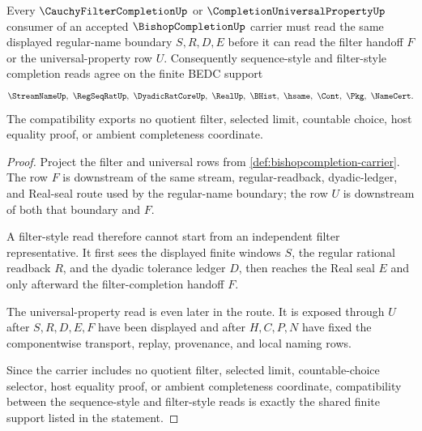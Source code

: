 \begin{theorem}
\label{thm:bishopcompletion-filter-compatibility}
Every $\CauchyFilterCompletionUp$ or $\CompletionUniversalPropertyUp$ consumer of an accepted $\BishopCompletionUp$ carrier must read the same displayed regular-name boundary $S,R,D,E$ before it can read the filter handoff $F$ or the universal-property row $U$. Consequently sequence-style and filter-style completion reads agree on the finite BEDC support
$$
\StreamNameUp,\ \RegSeqRatUp,\ \DyadicRatCoreUp,\ \RealUp,\ \BHist,\ \hsame,\ \Cont,\ \Pkg,\ \NameCert .
$$
The compatibility exports no quotient filter, selected limit, countable choice, host equality proof, or ambient completeness coordinate.
\end{theorem}
\begin{proof}
Project the filter and universal rows from \autoref{def:bishopcompletion-carrier}. The row $F$ is downstream of the same stream, regular-readback, dyadic-ledger, and Real-seal route used by the regular-name boundary; the row $U$ is downstream of both that boundary and $F$.

A filter-style read therefore cannot start from an independent filter representative. It first sees the displayed finite windows $S$, the regular rational readback $R$, and the dyadic tolerance ledger $D$, then reaches the Real seal $E$ and only afterward the filter-completion handoff $F$.

The universal-property read is even later in the route. It is exposed through $U$ after $S,R,D,E,F$ have been displayed and after $H,C,P,N$ have fixed the componentwise transport, replay, provenance, and local naming rows.

Since the carrier includes no quotient filter, selected limit, countable-choice selector, host equality proof, or ambient completeness coordinate, compatibility between the sequence-style and filter-style reads is exactly the shared finite support listed in the statement.
\end{proof}

